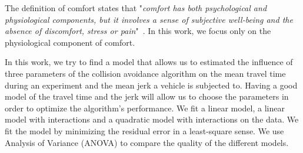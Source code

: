 
The definition of comfort states that "\textit{comfort has both psychological and physiological components, but it involves a sense of subjective well-being and the absence of discomfort, stress or pain}"~\cite{richards_psychology_1980}. In this work, we focus only on the physiological component of comfort. 

In this work, we try to find a model that allows us to estimated the influence of three parameters of the collision avoidance algorithm on the mean travel time during an experiment and the mean jerk a vehicle is subjected to. Having a good model of the travel time and the jerk will allow us to choose the parameters in order to optimize the algorithm's performance. We fit a linear model, a linear model with interactions and a quadratic model with interactions on the data. We fit the model by minimizing the residual error in a least-square sense.
We use Analysis of Variance (ANOVA) to compare the quality of the different models.
